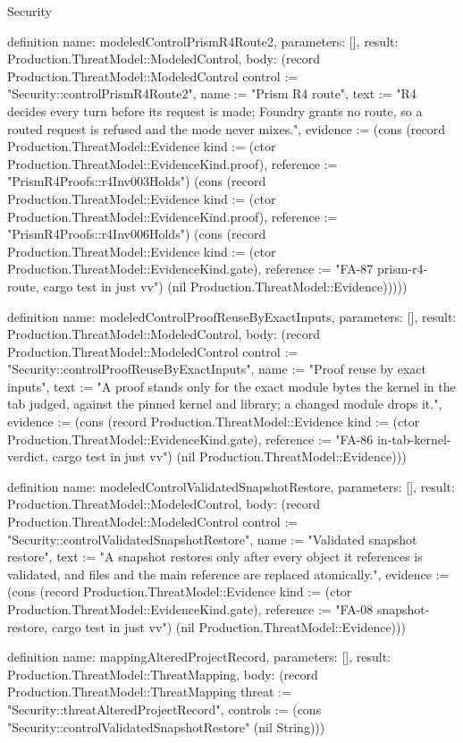 \begin{lexlean}{Security}
\begin{semanticmodule}
definition{
  name: modeledControlPrismR4Route2,
  parameters: [],
  result: Production.ThreatModel::ModeledControl,
  body: (record Production.ThreatModel::ModeledControl {control := "Security::controlPrismR4Route2", name := "Prism R4 route", text := "R4 decides every turn before its request is made; Foundry grants no route, so a routed request is refused and the mode never mixes.", evidence := (cons (record Production.ThreatModel::Evidence {kind := (ctor Production.ThreatModel::EvidenceKind.proof), reference := "PrismR4Proofs::r4Inv003Holds"}) (cons (record Production.ThreatModel::Evidence {kind := (ctor Production.ThreatModel::EvidenceKind.proof), reference := "PrismR4Proofs::r4Inv006Holds"}) (cons (record Production.ThreatModel::Evidence {kind := (ctor Production.ThreatModel::EvidenceKind.gate), reference := "FA-87 prism-r4-route, cargo test in just vv"}) (nil Production.ThreatModel::Evidence))))})
}

definition{
  name: modeledControlProofReuseByExactInputs,
  parameters: [],
  result: Production.ThreatModel::ModeledControl,
  body: (record Production.ThreatModel::ModeledControl {control := "Security::controlProofReuseByExactInputs", name := "Proof reuse by exact inputs", text := "A proof stands only for the exact module bytes the kernel in the tab judged, against the pinned kernel and library; a changed module drops it.", evidence := (cons (record Production.ThreatModel::Evidence {kind := (ctor Production.ThreatModel::EvidenceKind.gate), reference := "FA-86 in-tab-kernel-verdict, cargo test in just vv"}) (nil Production.ThreatModel::Evidence))})
}

definition{
  name: modeledControlValidatedSnapshotRestore,
  parameters: [],
  result: Production.ThreatModel::ModeledControl,
  body: (record Production.ThreatModel::ModeledControl {control := "Security::controlValidatedSnapshotRestore", name := "Validated snapshot restore", text := "A snapshot restores only after every object it references is validated, and files and the main reference are replaced atomically.", evidence := (cons (record Production.ThreatModel::Evidence {kind := (ctor Production.ThreatModel::EvidenceKind.gate), reference := "FA-08 snapshot-restore, cargo test in just vv"}) (nil Production.ThreatModel::Evidence))})
}

definition{
  name: mappingAlteredProjectRecord,
  parameters: [],
  result: Production.ThreatModel::ThreatMapping,
  body: (record Production.ThreatModel::ThreatMapping {threat := "Security::threatAlteredProjectRecord", controls := (cons "Security::controlValidatedSnapshotRestore" (nil String))})
}


\end{semanticmodule}
\end{lexlean}

